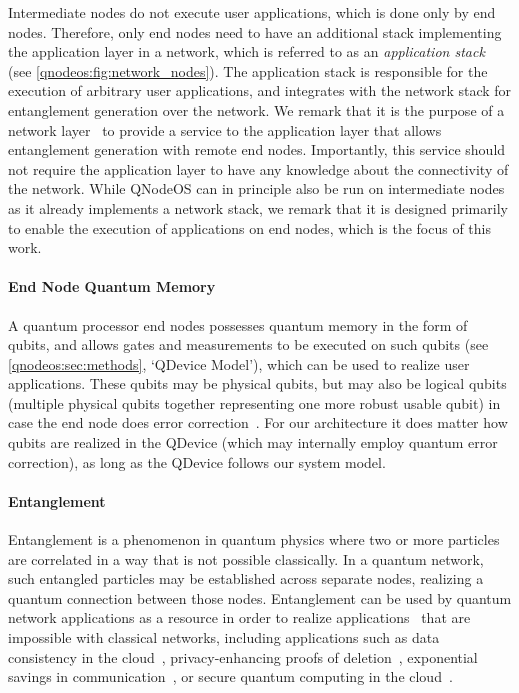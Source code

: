 Intermediate nodes do not execute user applications, which is done only by end nodes. 
Therefore, only end nodes need to have an additional stack implementing the application layer in a network, which is referred to as an \emph{application stack} (see \cref{qnodeos:fig:network_nodes}). The application stack is responsible for the execution of arbitrary user applications, and integrates with the network stack for entanglement generation over the network. We remark that it is the purpose of a network layer~\cite{dahlberg_2019_egp, kozlowski_2020_qnp} to provide a service to the application layer that allows entanglement generation with remote end nodes. Importantly, this service should not require the application layer to have any knowledge about the connectivity of the network. While QNodeOS can in principle also be run on intermediate nodes as it already implements a network stack, we remark that it is designed primarily to enable the execution of applications on end nodes, which is the focus of this work. 

\paragraph{End Node Quantum Memory}

A quantum processor end nodes possesses quantum memory in the form of qubits, and allows gates and measurements to be executed on such qubits (see \cref{qnodeos:sec:methods}, `QDevice Model'), which can be used to realize user applications. These qubits may be physical qubits, but may also be logical qubits (multiple physical qubits together representing one more robust usable qubit) in case the end node does error correction~\cite{lidar2013quantum}. For our architecture it does matter how qubits are realized in the QDevice (which may internally employ quantum error correction), as long as the QDevice follows our system model.

\paragraph{Entanglement}

Entanglement is a phenomenon in quantum physics where two or more particles are correlated in a way that is not possible classically. In a quantum network, such entangled particles may be established across separate nodes, realizing a quantum connection between those nodes. Entanglement can be used by quantum network applications as a resource in order to realize applications~\cite{wehner_2018_stages} that are impossible with classical networks, including applications such as data consistency in the cloud~\cite{benor_2005_byzantine}, privacy-enhancing proofs of deletion~\cite{poremba_quantum_2022}, exponential savings in communication~\cite{guerin_exponential_2016}, or secure quantum computing in the cloud~\cite{broadbent_2009_ubqc,childs_2005_secure_qc}.

